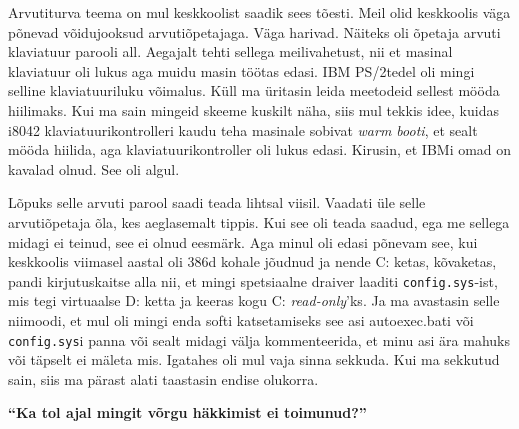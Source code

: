 Arvutiturva teema on mul keskkoolist saadik sees tõesti. Meil olid keskkoolis
väga põnevad võidujooksud arvutiõpetajaga. Väga harivad. Näiteks oli õpetaja
arvuti klaviatuur parooli all. Aegajalt tehti sellega meilivahetust, nii et
masinal klaviatuur oli lukus aga muidu masin töötas edasi. IBM
PS/2tedel oli mingi selline klaviatuuriluku võimalus. Küll ma üritasin
leida meetodeid sellest mööda hiilimaks. Kui ma sain mingeid skeeme kuskilt
näha, siis mul tekkis idee, kuidas i8042 klaviatuurikontrolleri kaudu teha
masinale sobivat \emph{warm booti}, et sealt mööda hiilida, aga
klaviatuurikontroller oli lukus edasi. Kirusin, et IBMi omad on kavalad olnud.
See oli algul.

Lõpuks selle arvuti parool saadi teada lihtsal viisil. Vaadati üle selle
arvutiõpetaja õla, kes aeglasemalt tippis. Kui see oli teada saadud, ega me
sellega midagi ei teinud, see ei olnud eesmärk. Aga minul oli edasi põnevam
see, kui keskkoolis viimasel aastal oli 386d kohale jõudnud ja nende C: ketas,
kõvaketas, pandi kirjutuskaitse alla nii, et mingi spetsiaalne draiver laaditi
\verb|config.sys|-ist, mis tegi virtuaalse D: ketta ja keeras kogu C:
\emph{read-only}'ks. Ja ma avastasin selle niimoodi, et mul oli mingi enda
softi katsetamiseks see asi autoexec.bati või \verb|config.sys|i panna või
sealt midagi välja kommenteerida, et minu asi ära mahuks või täpselt ei mäleta
mis. Igatahes oli mul vaja sinna sekkuda. Kui ma sekkutud sain, siis ma pärast
alati taastasin endise olukorra.

\textbf{\enquote{Ka tol ajal mingit võrgu häkkimist ei toimunud?}}

